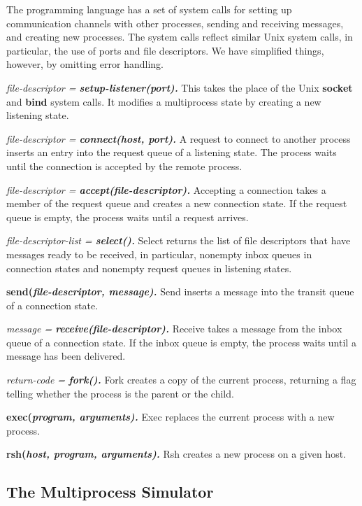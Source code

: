 \documentclass{article}
\begin{document}
The programming language has a set of system calls for
setting up communication channels with other processes,
sending and receiving messages, and creating new processes.
The system calls reflect similar Unix system calls, in
particular, the use of ports and file descriptors.  We
have simplified things, however, by omitting error handling.

\begin{description}
\item{\it file-descriptor \rm = \bf setup-listener(\it port\/\bf).}
This takes the place of the Unix \textbf{socket} and \textbf{bind}
system calls.  It modifies a multiprocess state by creating
a new listening state.
\item{\it file-descriptor \rm = \bf connect(\it host, port\/\bf).}
A request to connect to another process inserts an entry into
the request queue of a listening state.
The process waits until the connection is accepted by the remote process.
\item{\it file-descriptor \rm = \bf accept(\it file-descriptor\/\bf).}
Accepting a connection takes a member of the request queue and
creates a new connection state.
If the request queue is empty, the process waits until a request arrives.
\item{\it file-descriptor-list \rm = \bf select().}
Select returns the list of file descriptors that have messages
ready to be received, in particular, nonempty inbox queues in
connection states and nonempty request queues in listening states.
\item{\bf send(\it file-descriptor, message\/\bf).}
Send inserts a message into the transit queue of a connection state.
\item{\it message \rm = \bf receive(\it file-descriptor\/\bf).}
Receive takes a message from the inbox queue of a connection state.
If the inbox queue is empty, the process waits
until a message has been delivered.
\item{\it return-code \rm = \bf fork(\it \/\bf).}
Fork creates a copy of the current process, returning a flag telling
whether the process is the parent or the child.
\item{\bf exec(\it program, arguments\/\bf).}
Exec replaces the current process with a new process.
\item{\bf rsh(\it host, program, arguments\/\bf).}
Rsh creates a new process on a given host.
\end{description}

\subsection{The Multiprocess Simulator}
\end{document}
